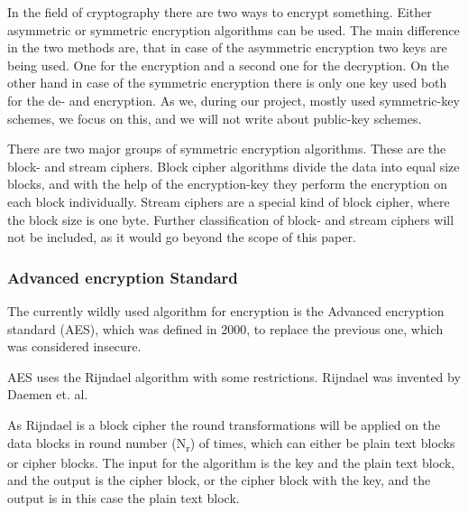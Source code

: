 \documentclass[12pt,a4paper,titlepage,oneside]{scrartcl}
\begin{document}
In the field of cryptography there are two ways to encrypt something.
Either asymmetric or symmetric encryption algorithms can be used.
The main difference in the two methods are, that in case of the asymmetric encryption two keys are being used.
One for the encryption and a second one for the decryption.
On the other hand in case of the symmetric encryption there is only one key used both for the de- and encryption.
As we, during our project, mostly used symmetric-key schemes, we focus on this, and we will not write about public-key schemes.

There are two major groups of symmetric encryption algorithms.
These are the block- and stream ciphers.
Block cipher algorithms divide the data into equal size blocks, and with the help of the encryption-key they perform the encryption on each block individually.
Stream ciphers are a special kind of block cipher, where the block size is one byte. \cite{menezes1996handbook}
Further classification of block- and stream ciphers will not be included, as it would go beyond the scope of this paper.

\subsubsection{Advanced encryption Standard}
The currently wildly used algorithm for encryption is the Advanced encryption standard (AES), which was defined in 2000, to replace the previous one, which was considered insecure.

AES uses the Rijndael algorithm with some restrictions.
Rijndael was invented by Daemen et. al. \cite{daemen2013design}

As Rijndael is a block cipher the round transformations will be applied on the data blocks in round number (N\textsubscript{r}) of times, which can either be plain text blocks or cipher blocks.
The input for the algorithm is the key and the plain text block, and the output is the cipher block, or the cipher block with the key, and the output is in this case the plain text block. \cite{daemen2013design}
\end{document}
